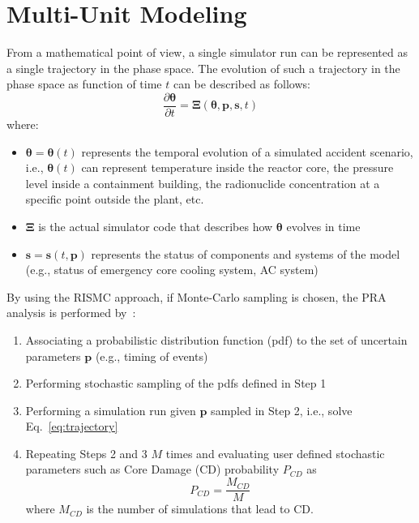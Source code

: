 \section{Multi-Unit Modeling}
\label{sec:multiUnitModeling}

From a mathematical point of view, a single simulator run can be represented 
as a single trajectory in the phase space. The evolution of such a trajectory 
in the phase space as function of time $t$ can be described as follows:
\begin{equation}
    \frac{\partial \boldsymbol \theta }{\partial t}  = \boldsymbol \Xi (\boldsymbol \theta , \boldsymbol p, \boldsymbol s , t) 
    \label{eq:trajectory}
\end{equation}
where:
\begin{itemize}
  \item $\boldsymbol \theta = \boldsymbol \theta(t)$ represents the temporal 
        evolution of a simulated accident scenario, i.e., $\boldsymbol \theta(t)$ can 
        represent temperature inside the reactor core, the pressure level inside a containment
        building, the radionuclide concentration at a specific point outside the plant, etc.
  \item $\boldsymbol \Xi$ is the actual simulator code that describes how $\boldsymbol \theta$ 
        evolves in time
  \item $\boldsymbol s = \boldsymbol s(t,\boldsymbol p)$ represents the status of components 
        and systems of the model (e.g., status of emergency core cooling system, AC system)
\end{itemize}

By using the RISMC approach, if Monte-Carlo sampling is chosen, the PRA analysis is performed 
by~\cite{BWR_SBO_Mandelli}:
\begin{enumerate}
  \item Associating a probabilistic distribution function (pdf) to the set of uncertain 
        parameters $\boldsymbol p$ (e.g., timing of events)
  \item Performing stochastic sampling of the pdfs defined in Step 1
  \item Performing a simulation run given $\boldsymbol p$ sampled in Step 2, i.e., solve Eq.~\ref{eq:trajectory}
  \item Repeating Steps 2 and 3 $M$ times and evaluating user defined stochastic parameters such as 
        Core Damage (CD) probability $P_{CD}$ as
        \begin{equation}
            P_{CD} = \frac{M_{CD}}{M} 
            \label{eq:CDprobability}
        \end{equation}
        where $M_{CD}$ is the number of simulations that lead to CD. 
\end{enumerate}


